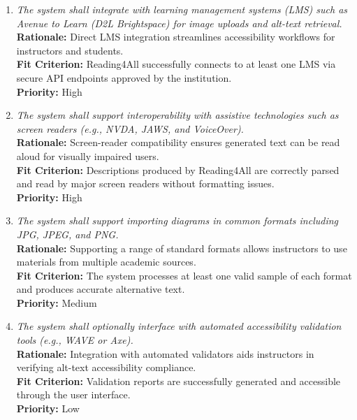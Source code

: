\documentclass[12pt]{article}
\begin{document}
\begin{enumerate}[label=OER-IAS\arabic*., wide=0pt, leftmargin=*]
  \item \emph{The system shall integrate with learning management systems (LMS) such as Avenue to Learn (D2L Brightspace) for image uploads and alt-text retrieval.}\\[2mm]
    {\bf Rationale:} Direct LMS integration streamlines accessibility workflows for instructors and students.\\
    {\bf Fit Criterion:} Reading4All successfully connects to at least one LMS via secure API endpoints approved by the institution.\\
    {\bf Priority:} High

  \item \emph{The system shall support interoperability with assistive technologies such as screen readers (e.g., NVDA, JAWS, and VoiceOver).}\\[2mm]
    {\bf Rationale:} Screen-reader compatibility ensures generated text can be read aloud for visually impaired users.\\
    {\bf Fit Criterion:} Descriptions produced by Reading4All are correctly parsed and read by major screen readers without formatting issues.\\
    {\bf Priority:} High

  \item \emph{The system shall support importing diagrams in common formats including JPG, JPEG, and PNG.}\\[2mm]
    {\bf Rationale:} Supporting a range of standard formats allows instructors to use materials from multiple academic sources.\\
    {\bf Fit Criterion:} The system processes at least one valid sample of each format and produces accurate alternative text.\\
    {\bf Priority:} Medium

  \item \emph{The system shall optionally interface with automated accessibility validation tools (e.g., WAVE or Axe).}\\[2mm]
    {\bf Rationale:} Integration with automated validators aids instructors in verifying alt-text accessibility compliance.\\
    {\bf Fit Criterion:} Validation reports are successfully generated and accessible through the user interface.\\
    {\bf Priority:} Low
\end{enumerate}
\end{document}
